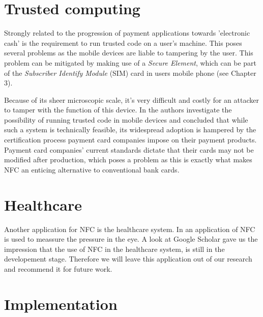 \section{Trusted computing}
Strongly related to the progression of payment applications towards 'electronic cash' is the requirement to run trusted code on a user's machine.
This poses several problems as the mobile devices are liable to tampering by the user.
This problem can be mitigated by making use of a \textit{Secure Element}, which can be part of the \textit{Subscriber Identify Module} (SIM) card in users mobile phone (see Chapter 3).

Because of its sheer microscopic scale, it's very difficult and costly for an attacker to tamper with the function of this device.
In \cite{1497411} the authors investigate the possibility of running trusted code in mobile devices and concluded that while such a system is technically feasible, its widespread adoption is hampered by the certification process payment card companies impose on their payment products.
Payment card companies' current standards dictate that their cards may not be modified after production, which poses a problem as this is exactly what makes NFC an enticing alternative to conventional bank cards.

\section{Healthcare}
Another application for NFC is the healthcare system. In \cite{RFIDHB} an application of NFC is used to meassure the pressure in the eye. A look at Google Scholar gave us the impression that the use of NFC in the healthcare system, is still in the developement stage. Therefore we will leave this application out of our research and recommend it for future work. %


\section{Implementation} %

